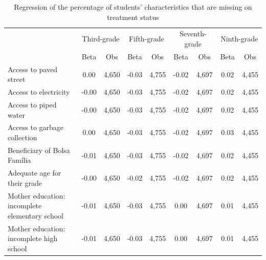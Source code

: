 \documentclass[
	article,			%
	12pt,				%
	oneside,			%
	a4paper,			%
	]{article}
\begin{document}


\begin{table}[htbp]
  \centering
\fontsize{9}{11}\selectfont
 \begin{threeparttable}
  \caption{Regression of the percentage of students' characteristics that are missing on treatment status}
    \begin{tabular}{lcccccccc}
\hline
\hline
           & \multicolumn{ 2}{c}{Third-grade} & \multicolumn{ 2}{c}{Fifth-grade} & \multicolumn{ 2}{c}{Seventh-grade} & \multicolumn{ 2}{c}{Ninth-grade} \\

           &       Beta &        Obs &       Beta &        Obs &       Beta &        Obs &       Beta &        Obs \\
\hline
Access to paved street &       0.00 &      4,650 &      -0.03 &      4,755 &      -0.02 &      4,697 &       0.02 &      4,455 \\

Access to electricity &      -0.00 &      4,650 &      -0.03 &      4,755 &      -0.02 &      4,697 &       0.02 &      4,455 \\

Access to piped water &      -0.00 &      4,650 &      -0.03 &      4,755 &      -0.02 &      4,697 &       0.02 &      4,455 \\

Access to garbage collection &       0.00 &      4,650 &      -0.03 &      4,755 &      -0.02 &      4,697 &       0.03 &      4,455 \\

Beneficiary of Bolsa Família &      -0.01 &      4,650 &      -0.03 &      4,755 &      -0.02 &      4,697 &       0.02 &      4,455 \\

Adequate age for their grade  &      -0.00 &      4,650 &      -0.02 &      4,755 &      -0.02 &      4,697 &       0.02 &      4,455 \\

Mother education: incomplete elementary school &      -0.01 &      4,650 &      -0.03 &      4,755 &       0.00 &      4,697 &       0.01 &      4,455 \\

Mother education: incomplete high school &      -0.01 &      4,650 &      -0.03 &      4,755 &       0.00 &      4,697 &       0.01 &      4,455 \\


\end{tabular}
\end{threeparttable}
\end{table}
\end{document}
